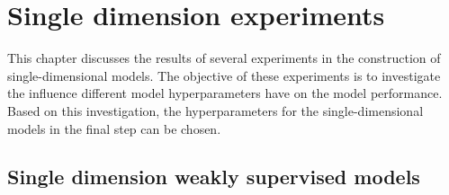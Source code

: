 \chapter{Single dimension experiments \label{sec:singleDimension}}

\par{
    This chapter discusses the results of several experiments in the construction of single-dimensional models.
    The objective of these experiments is to investigate the influence different model hyperparameters have on the model performance.
    Based on this investigation, the hyperparameters for the single-dimensional models in the final step can be chosen.  
}

\section{Single dimension weakly supervised models}

